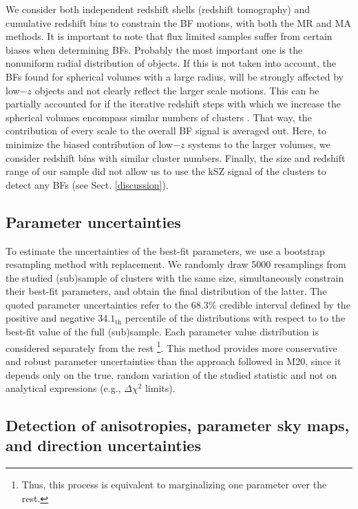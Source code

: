 \documentclass{aa}   %
\begin{document}
We consider both independent redshift shells (redshift tomography) and cumulative redshift bins to constrain the BF motions, with both the MR and MA methods. It is important to note that flux limited samples suffer from certain biases when determining BFs. Probably the most important one is the nonuniform radial distribution of objects. If this is not taken into account, the BFs found for spherical volumes with a large radius, will be strongly affected by low$-z$ objects and not clearly reflect the larger scale motions. This can be partially accounted for if the iterative redshift steps with which we increase the spherical volumes encompass similar numbers of clusters \citep[e.g.,][and references therein]{peery}. That way, the contribution of every scale to the overall BF signal is averaged out. Here, to minimize the biased contribution of low$-z$ systems to the larger volumes, we consider redshift bins with similar cluster numbers. Finally, the size and redshift range of our sample did not allow us to use the kSZ signal of the clusters to detect any BFs (see Sect. \ref{discussion}).

\subsection{Parameter uncertainties} \label{uncertainties}

To estimate the uncertainties of the best-fit parameters, we use a bootstrap resampling method with replacement. We randomly draw 5000 resamplings from the studied (sub)sample of clusters with the same size, simultaneously constrain their best-fit parameters, and obtain the final distribution of the latter. The quoted parameter uncertainties refer to the $68.3\%$ credible interval defined by the positive and negative $34.1_{\text{th}}$ percentile of the distributions with respect to to the best-fit value of the full (sub)sample. Each parameter value distribution is considered separately from the rest \footnote{Thus, this process is equivalent to marginalizing one parameter over the rest.}. This method provides more conservative and robust parameter uncertainties than the approach followed in M20, since it depends only on the true, random variation of the studied statistic and not on analytical expressions (e.g., $\Delta \chi ^2$ limits). 

\subsection{Detection of anisotropies, parameter sky maps, and direction uncertainties}\label{anis_detect}
\end{document}
